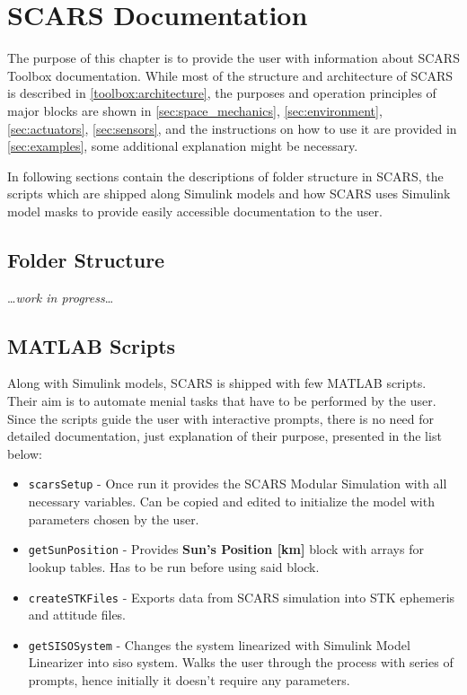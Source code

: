 \section{SCARS Documentation}\label{sec:documentation}
    The purpose of this chapter is to provide the user with information about SCARS Toolbox documentation. While most of the structure and architecture of SCARS is described in \autoref{toolbox:architecture}, the purposes and operation principles of major blocks are shown in \autoref{sec:space_mechanics}, \ref{sec:environment}, \ref{sec:actuators},  \ref{sec:sensors},   and the instructions on how to use it are provided in \autoref{sec:examples}, some additional explanation might be necessary. 
    
    In following sections contain the descriptions of folder structure in SCARS, the scripts which are shipped along Simulink models and how SCARS uses Simulink model masks to provide easily accessible documentation to the user.
    


    \subsection{Folder Structure}
        \dots\textit{work in progress}\dots
    


    \subsection{MATLAB Scripts}\label{sec:scripts}
        Along with Simulink models, SCARS is shipped with few MATLAB scripts. Their aim is to automate menial tasks that have to be performed by the user. Since the scripts guide the user with interactive prompts, there is no need for detailed documentation, just explanation of their purpose, presented in the list below:
        
        \begin{itemize}
            \item \verb|scarsSetup| - Once run it provides the SCARS Modular Simulation with all necessary variables. Can be copied and edited to initialize the model with parameters chosen by the user.
            \item \verb|getSunPosition| - Provides \textbf{Sun's Position [km]} block with arrays for lookup tables. Has to be run before using said block.
            \item \verb|createSTKFiles| - Exports data from SCARS simulation into STK ephemeris and attitude files.
            \item \verb|getSISOSystem| - Changes the system linearized with Simulink Model Linearizer into \ac{siso} system. Walks the user through the process with series of prompts, hence initially it doesn't require any parameters.
        \end{itemize}
        
